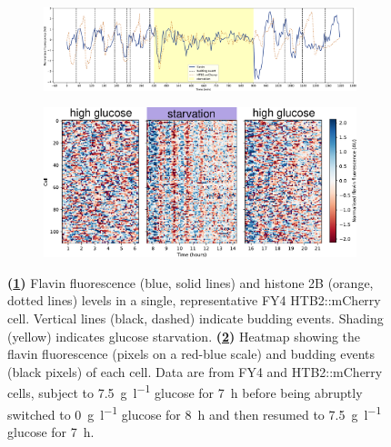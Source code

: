 \begin{figure}
  \centering
  \begin{subfigure}[htpb]{1.0\textwidth}
   \centering
   \includegraphics[width=\textwidth]{starvation_single_birth_plot_new_edit.pdf}
   \caption{
   }
   \label{fig:biology-starvation-single}
  \end{subfigure}

  \begin{subfigure}[htpb]{0.9\textwidth}
   \centering
   \includegraphics[width=\textwidth]{heatmap_012_edit.pdf}
   \caption{
   }
   \label{fig:biology-starvation-heatmap}
  \end{subfigure}

  \caption[
    Flavin fluorescence and histone 2B levels in a single, representative FY4 HTB2::mCherry cell.
    Heatmap showing the flavin fluorescence and budding events of each cell.
    Data are from FY4 and HTB2::mCherry cells, subject to glucose starvation.
  ]{
    \textbf{(\ref{fig:biology-starvation-single})}
    Flavin fluorescence (blue, solid lines) and histone 2B (orange, dotted lines) levels in a single, representative FY4 HTB2::mCherry cell.
    Vertical lines (black, dashed) indicate budding events.
    Shading (yellow) indicates glucose starvation.
    \textbf{(\ref{fig:biology-starvation-heatmap})}
    Heatmap showing the flavin fluorescence (pixels on a red-blue scale) and budding events (black pixels) of each cell.
    Data are from FY4 and HTB2::mCherry cells, subject to \SI{7.5}{\gram~\litre^{-1}} glucose for \SI{7}{\hour} before being abruptly switched to \SI{0}{\gram~\litre^{-1}} glucose for \SI{8}{\hour} and then resumed to \SI{7.5}{\gram~\litre^{-1}} glucose for \SI{7}{\hour}.
  }
  \label{fig:biology-starvation}
\end{figure}


